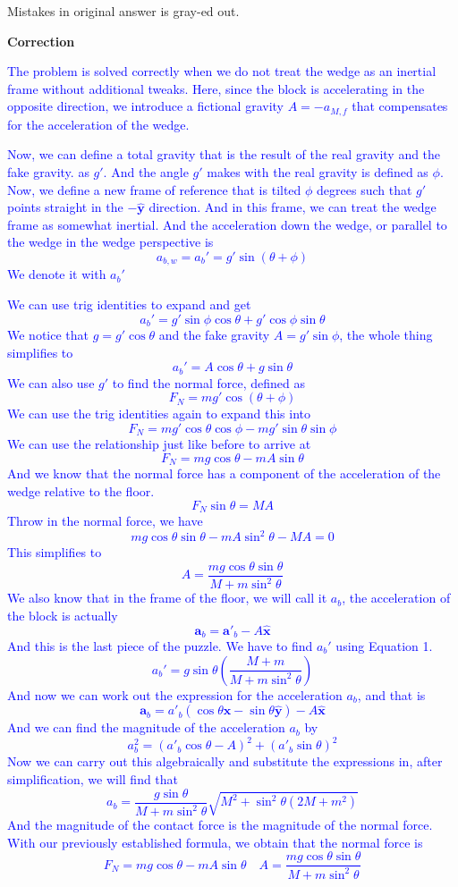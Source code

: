 \documentclass[12pt]{article}
\newcommand{\paren}[1]{\left( #1 \right)}
\newcommand{\unx}{\hat{\mathbf{x}}}
\newcommand{\uny}{\hat{\mathbf{y}}}
\begin{document}
\begin{enumerate}
Mistakes in original answer is gray-ed out.


\begin{large}
    \textbf{Correction}
\end{large}


\textcolor{blue}{The problem is solved correctly when we do not treat the wedge as an inertial frame without additional tweaks. Here, since the block is accelerating in the opposite direction, we introduce a fictional gravity $A = -a_{M,f}$ that compensates for the acceleration of the wedge.}

\textcolor{blue}{Now, we can define a total gravity that is the result of the real gravity and the fake gravity. as $g'$. And the angle $g'$ makes with the real gravity is defined as $\phi$. Now, we define a new frame of reference that is tilted $\phi$ degrees such that $g'$ points straight in the $-\uny$ direction. And in this frame, we can treat the wedge frame as somewhat inertial. And the acceleration down the wedge, or parallel to the wedge in the wedge perspective is
\[
a_{b,w} = a_b' = g'\sin\paren{\theta+\phi}
\]
We denote it with $a_b'$}

\textcolor{blue}{We can use trig identities to expand and get
\[
a_b' = g'\sin\phi\cos\theta + g'\cos\phi\sin\theta
\]
We notice that $g = g'\cos\theta$ and the fake gravity $A = g'\sin\phi$, the whole thing simplifies to
\[
a_b' = A\cos\theta + g\sin\theta \tag{Eq.1}
\]
We can also use $g'$ to find the normal force, defined as
\[
F_N = mg'\cos\paren{\theta+\phi}
\]
We can use the trig identities again to expand this into
\[
F_N = mg'\cos\theta\cos\phi - mg'\sin\theta\sin\phi
\]
We can use the relationship just like before to arrive at
\[
F_N = mg\cos\theta - mA\sin\theta \tag{Eq.2}
\]
And we know that the normal force has a component of the acceleration of the wedge relative to the floor.
\[
F_N\sin\theta = MA 
\]
Throw in the normal force, we have
\[
mg\cos\theta\sin\theta - mA\sin^2\theta - MA = 0
\]
This simplifies to
\[
A = \frac{mg\cos\theta\sin\theta}{M+m\sin^2\theta} \tag{Eq.3}
\]
We also know that in the frame of the floor, we will call it $a_b$, the acceleration of the block is actually
\[
\textbf{a}_b = \textbf{a}'_b - A\unx \tag{Eq.4}
\]
And this is the last piece of the puzzle. We have to find $a_b'$ using Equation 1.
\[
a_b' = g\sin\theta\paren{\frac{M+m}{M+m\sin^2\theta}}
\]
And now we can work out the expression for the acceleration $a_b$, and that is
\[
\mathbf{a}_b = a'_b\paren{\cos\theta \unx -\sin\theta\uny} - A\unx
\]
And we can find the magnitude of the acceleration $a_b$ by
\[
a_b^2 = \paren{a'_b\cos\theta - A}^2 + \paren{a'_b\sin\theta}^2
\]
Now we can carry out this algebraically and substitute the expressions in, after simplification, we will find that
\[
a_b =\frac{g\sin\theta}{M+m\sin^2\theta} \sqrt{M^2+\sin^2\theta\paren{2M+m^2}}
\]
And the magnitude of the contact force is the magnitude of the normal force. With our previously established formula, we obtain that the normal force is
\[
F_N = mg\cos\theta - mA\sin\theta \quad A = \frac{mg\cos\theta\sin\theta}{M+m\sin^2\theta} 
\]}

        
\end{enumerate}
\end{document}
